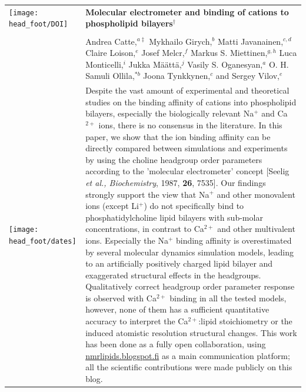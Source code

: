 \documentclass[twoside,twocolumn,9pt]{article}
\begin{document}
  \begin{@twocolumnfalse}
\vspace{3cm}
\sffamily
\begin{tabular}{m{4.5cm} p{13.5cm} }

\texttt{[image: head\_foot/DOI]} & \noindent\LARGE{\textbf{Molecular electrometer and binding of cations to phospholipid bilayers$^\dag$}} \\%
\vspace{0.3cm} & \vspace{0.3cm} \\

 & \noindent\large{Andrea Catte,\textit{$^{a\ddag}$} Mykhailo Girych,\textit{$^{b}$} Matti Javanainen,\textit{$^{c,d}$} Claire Loison,\textit{$^{e}$} Josef Melcr,\textit{$^{f}$} Markus S. Miettinen,\textit{$^{g,h}$} Luca Monticelli,\textit{$^{i}$} Jukka M{\"a}{\"a}tt{\"a},\textit{$^{j}$} Vasily S. Oganesyan,\textit{$^{a}$} O. H. Samuli Ollila,\textit{$^{\ast b}$} Joona Tynkkynen,\textit{$^{c}$} and Sergey Vilov,\textit{$^{e}$}
} \\%

\texttt{[image: head\_foot/dates]} & \noindent\normalsize{
Despite the vast amount of experimental and theoretical studies on the binding affinity of cations into phospholipid bilayers, 
especially the biologically relevant Na$^+$ and Ca$^{2+}$ ions,  there is no consensus in the literature. 
In this paper, we show that the ion binding affinity can be directly compared between simulations and experiments by 
using the choline headgroup order parameters according to the 'molecular electrometer' 
concept [Seelig \textit{et al., Biochemistry}, 1987, \textbf{26}, 7535].
Our findings strongly support the view that Na$^+$ and other monovalent ions
(except Li$^+$) do not specifically bind to phosphatidylcholine lipid bilayers with sub-molar concentrations, 
in contrast to Ca$^{2+}$ and other multivalent ions. Especially the Na$^+$ binding affinity is 
overestimated by several molecular dynamics simulation models, leading to 
an artificially positively charged lipid bilayer and exaggerated structural effects in the headgroups. 
Qualitatively correct headgroup order parameter response is observed with
Ca$^{2+}$ binding in all the tested models, however, none of them has a sufficient 
quantitative accuracy to interpret the Ca$^{2+}$:lipid stoichiometry or the induced atomistic resolution structural changes.
This work has been done as a fully open collaboration, using \url{nmrlipids.blogspot.fi} as a main communication platform; 
all the scientific contributions were made publicly on this blog. } \\%


\end{tabular}
\end{@twocolumnfalse}
\end{document}
